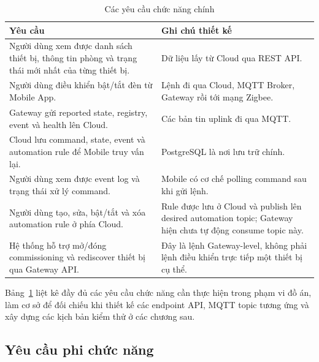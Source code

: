 \begin{table}[H]
    \centering
    \caption{Các yêu cầu chức năng chính}
    \label{tab:ch3-func-req}
    \footnotesize
    \setlength{\tabcolsep}{3pt}
    \begin{tabular}{|>{\raggedright\arraybackslash}p{}|>{\raggedright\arraybackslash}p{}|}
        \hline
        \textbf{Yêu cầu} & \textbf{Ghi chú thiết kế} \\
        \hline
        Người dùng xem được danh sách thiết bị, thông tin phòng và trạng thái mới nhất của từng thiết bị. & Dữ liệu lấy từ Cloud qua REST API. \\
        \hline
        Người dùng điều khiển bật/tắt đèn từ Mobile App. & Lệnh đi qua Cloud, MQTT Broker, Gateway rồi tới mạng Zigbee. \\
        \hline
        Gateway gửi reported state, registry, event và health lên Cloud. & Các bản tin uplink đi qua MQTT. \\
        \hline
        Cloud lưu command, state, event và automation rule để Mobile truy vấn lại. & PostgreSQL là nơi lưu trữ chính. \\
        \hline
        Người dùng xem được event log và trạng thái xử lý command. & Mobile có cơ chế polling command sau khi gửi lệnh. \\
        \hline
        Người dùng tạo, sửa, bật/tắt và xóa automation rule ở phía Cloud. & Rule được lưu ở Cloud và publish lên desired automation topic; Gateway hiện chưa tự động consume topic này. \\
        \hline
        Hệ thống hỗ trợ mở/đóng commissioning và rediscover thiết bị qua Gateway API. & Đây là lệnh Gateway-level, không phải lệnh điều khiển trực tiếp một thiết bị cụ thể. \\
        \hline
    \end{tabular}
    \setlength{\tabcolsep}{6pt}
\end{table}

Bảng~\ref{tab:ch3-func-req} liệt kê đầy đủ các yêu cầu chức năng cần thực hiện trong phạm vi đồ án, làm cơ sở để đối chiếu khi thiết kế các endpoint API, MQTT topic tương ứng và xây dựng các kịch bản kiểm thử ở các chương sau.

\newpage
\subsection{Yêu cầu phi chức năng}
\label{sec:ch3-yeucau-phichucnang}

